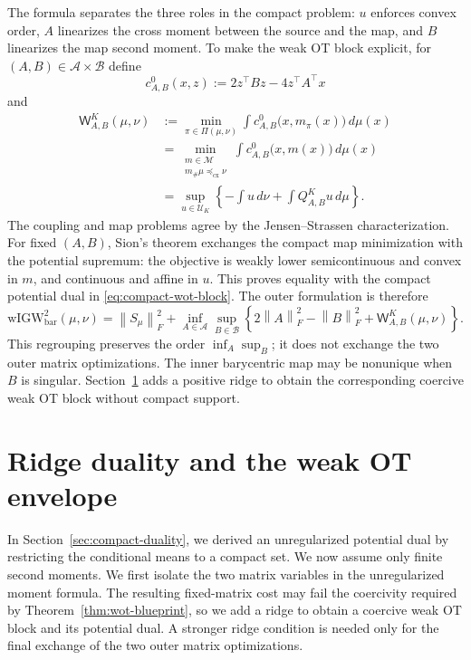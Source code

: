 \documentclass[11pt]{article}
\newcommand{\cU}{\mathcal U}
\newcommand{\cM}{\mathcal M}
\newcommand{\norm}[1]{\left\lVert #1\right\rVert}
\newcommand{\cx}{\preceq_{\mathrm{cx}}}
\newcommand{\wIGW}{\mathrm{wIGW}_{\mathrm{bar}}}
\theoremstyle{plain}
\theoremstyle{definition}
\theoremstyle{remark}
\begin{document}
The formula separates the three roles in the compact problem: \(u\) enforces
convex order, \(A\) linearizes the cross moment between the source and the map, and
\(B\) linearizes the map second moment. To make the weak OT block explicit, for
$(A,B)\in\mathcal A\times\mathcal B$ define
\[
 c^0_{A,B}(x,z):=2z^\top Bz-4z^\top A^\top x
\]
and
\begin{equation}\label{eq:compact-wot-block}
\begin{aligned}
 \mathsf W^K_{A,B}(\mu,\nu)
 &:=\min_{\pi\in\Pi(\mu,\nu)}
   \int c^0_{A,B}\bigl(x,m_\pi(x)\bigr)\,d\mu(x)\\
 &=\min_{\substack{m\in\cM\\m_\#\mu\cx\nu}}
   \int c^0_{A,B}\bigl(x,m(x)\bigr)\,d\mu(x)\\
 &=\sup_{u\in\cU_K}
   \left\{-\int u\,d\nu+\int Q^K_{A,B}u\,d\mu\right\}.
\end{aligned}
\end{equation}
The coupling and map problems agree by the Jensen--Strassen characterization.
For fixed $(A,B)$, Sion's theorem exchanges the compact map minimization with the
potential supremum: the objective is weakly lower semicontinuous and convex in
$m$, and continuous and affine in $u$. This proves equality with the compact
potential dual in \eqref{eq:compact-wot-block}. The outer formulation is therefore
\begin{equation}\label{eq:compact-wot-envelope}
 \wIGW^2(\mu,\nu)
 =\norm{S_\mu}_F^2+
 \inf_{A\in\mathcal A}\sup_{B\in\mathcal B}
 \left\{2\norm A_F^2-\norm B_F^2+
 \mathsf W^K_{A,B}(\mu,\nu)\right\}.
\end{equation}
This regrouping preserves the order $\inf_A\sup_B$; it does not exchange the two
outer matrix optimizations. The inner barycentric map may be nonunique when $B$ is
singular. Section~\ref{sec:ridge-duality} adds a positive ridge to obtain the
corresponding coercive weak OT block without compact support.

\section{Ridge duality and the weak OT envelope}\label{sec:ridge-duality}

In Section~\ref{sec:compact-duality}, we derived an unregularized potential dual
by restricting the conditional means to a compact set. We now assume only finite
second moments. We first isolate the two matrix variables in the unregularized
moment formula. The resulting fixed-matrix cost may fail the coercivity required
by Theorem~\ref{thm:wot-blueprint}, so we add a ridge to obtain a coercive weak
OT block and its potential dual. A stronger ridge condition is needed only for
the final exchange of the two outer matrix optimizations.
\end{document}
